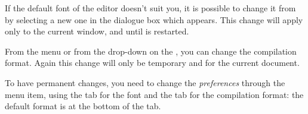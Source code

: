 If the default font of the editor doesn't suit you, it is possible to change it from \submenu{} by selecting a new one in the dialogue box which appears. This change will apply only to the current window, and until {\Tw} is restarted.

From the  menu or from the drop-down on the , you can change the compilation format. Again this change will only be temporary and for the current document.

To have permanent changes, you need to change the \emph{preferences} through the \submenu{} menu item, using the  tab for the font and the  tab for the compilation format: the default format is at the bottom of the tab.

